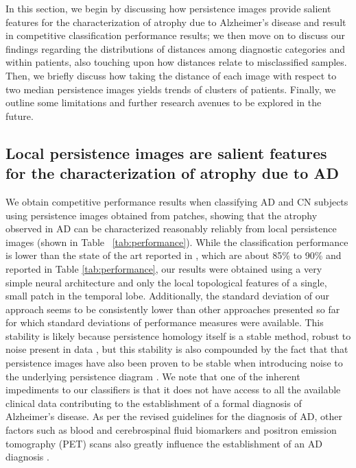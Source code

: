\documentclass{article}
\begin{document}
In this section, we begin by discussing how persistence images provide salient features for the
characterization of atrophy due to Alzheimer's disease and result in competitive classification
performance results; we then move on to discuss our findings regarding the distributions of
distances among diagnostic categories and within patients, also touching upon how distances relate
to misclassified samples. Then, we briefly discuss how taking the distance of each image with
respect to two median persistence images yields trends of clusters of patients. Finally, we outline
some limitations and further research avenues to be explored in the future.

\subsection{Local persistence images are salient features for the characterization of atrophy due to AD }

We obtain competitive performance results when classifying AD and CN subjects using persistence
images obtained from patches, showing that the atrophy observed in AD can be characterized
reasonably reliably from local persistence images (shown in Table ~\ref{tab:performance}). While the
classification performance is lower than the state of the art reported in \citep{liu2018anatomical},
which are about 85\% to 90\% and reported in Table \ref{tab:performance}, our results were obtained
using a very simple neural architecture and only the local topological features of a single, small
patch in the temporal lobe. Additionally, the standard deviation of our approach seems to be
consistently lower than other approaches presented so far for which standard deviations of
performance measures were available. This stability is likely because persistence
homology itself is a stable method, robust to noise present in data \citep{cohen2007stability},
but this stability is also compounded by the fact that that persistence images have also been proven
to be stable when introducing noise to the underlying persistence diagram
\cite{adams2017persistence}. We note that one of the inherent impediments to our classifiers is that
it does not have access to all the available clinical data contributing to the establishment of
a formal diagnosis of Alzheimer's disease. As per the revised guidelines for the diagnosis of AD,
other factors such as blood and cerebrospinal fluid biomarkers and positron emission tomography
(PET) scans also greatly influence the establishment of an AD diagnosis \citep{mckhann2011diagnosis}.
\end{document}
